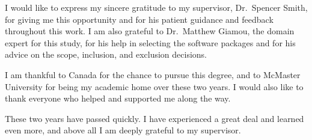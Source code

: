 
I would like to express my sincere gratitude to my supervisor, Dr.~Spencer
Smith, for giving me this opportunity and for his patient guidance and feedback
throughout this work. I am also grateful to Dr.~Matthew Giamou, the domain
expert for this study, for his help in selecting the software packages and for
his advice on the scope, inclusion, and exclusion decisions.

I am thankful to Canada for the chance to pursue this degree, and to McMaster
University for being my academic home over these two years. I would also like to
thank everyone who helped and supported me along the way.

These two years have passed quickly. I have experienced a great deal and learned
even more, and above all I am deeply grateful to my supervisor.
